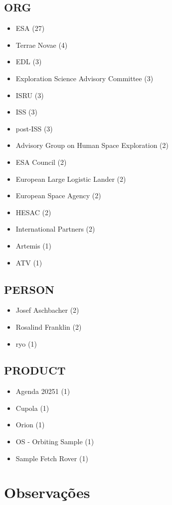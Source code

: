 \documentclass[12pt]{article}
\begin{document}
\subsection*{ORG}
\begin{itemize}
\item ESA (27)
\item Terrae Novae (4)
\item EDL (3)
\item Exploration Science Advisory Committee (3)
\item ISRU (3)
\item ISS (3)
\item post-ISS (3)
\item Advisory Group on Human Space Exploration (2)
\item ESA Council (2)
\item European Large Logistic Lander (2)
\item European Space Agency (2)
\item HESAC (2)
\item International Partners (2)
\item Artemis (1)
\item ATV (1)
\end{itemize}

\subsection*{PERSON}
\begin{itemize}
\item Josef Aschbacher (2)
\item Rosalind Franklin (2)
\item ryo (1)
\end{itemize}

\subsection*{PRODUCT}
\begin{itemize}
\item Agenda 20251 (1)
\item Cupola (1)
\item Orion (1)
\item OS - Orbiting Sample (1)
\item Sample Fetch Rover (1)
\end{itemize}


\section{Observações}
\end{document}
